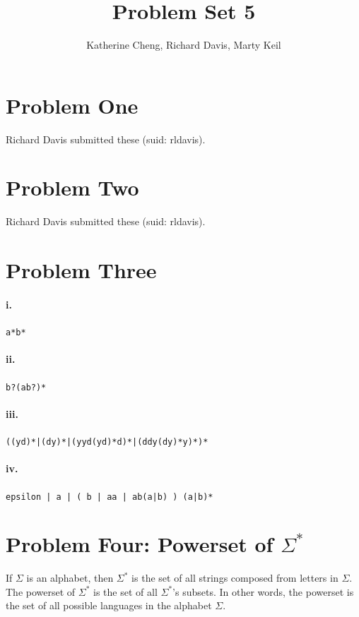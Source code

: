 \documentclass[10pt,letter]{article}
\begin{document}

\title{Problem Set 5}

\author{Katherine Cheng, Richard Davis, Marty Keil}

 
\maketitle 

\section*{Problem One} Richard Davis submitted these (suid: rldavis).

\section*{Problem Two} Richard Davis submitted these (suid: rldavis).

\section*{Problem Three} 

\paragraph{i.} \texttt{a*b*}
\paragraph{ii.} \texttt{b?(ab?)*}
\paragraph{iii.} \texttt{((yd)*|(dy)*|(yyd(yd)*d)*|(ddy(dy)*y)*)*}
\paragraph{iv.} \texttt{epsilon | a | ( b | aa | ab(a|b) ) (a|b)*}

\section*{Problem Four: Powerset of $\Sigma^*$}
If $\Sigma$ is an alphabet, then $\Sigma^*$ is the set of all strings composed from letters in $\Sigma$. The powerset of $\Sigma^*$ is the set of all $\Sigma^*$'s subsets. In other words, the powerset is the set of all possible languages in the alphabet $\Sigma$. 
\end{document}

